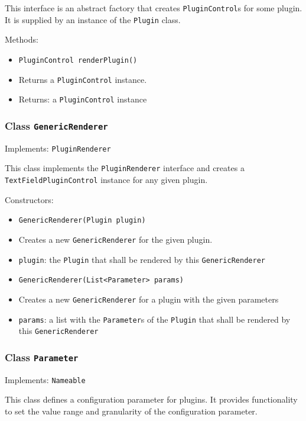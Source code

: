 \documentclass[parskip=full,11pt]{scrartcl}
\begin{document}
This interface is an abstract factory that creates \texttt{PluginControl}s for some plugin. It is supplied by an instance of the \texttt{Plugin} class.

Methods:

\begin{itemize}\itemsep -10pt
	\item \texttt{PluginControl renderPlugin()}
	\item[] Returns a \texttt{PluginControl} instance.
	\item[] Returns: a \texttt{PluginControl} instance
\end{itemize}

\subsubsection{Class \texttt{GenericRenderer}}
Implements: \texttt{PluginRenderer}

This class implements the \texttt{PluginRenderer} interface and creates a \texttt{TextFieldPluginControl} instance for any given plugin.

Constructors:
\begin{itemize}\itemsep -10pt
	\item \texttt{GenericRenderer(Plugin plugin)}
	\item[] Creates a new \texttt{GenericRenderer} for the given plugin.
	\item[] \texttt{plugin}: the \texttt{Plugin} that shall be rendered by this \texttt{GenericRenderer}

	\item \texttt{GenericRenderer(List<Parameter> params)}
	\item[] Creates a new \texttt{GenericRenderer} for a plugin with the given parameters
	\item[] \texttt{params}: a list with the \texttt{Parameter}s of the \texttt{Plugin} that shall be rendered by this \texttt{GenericRenderer}
\end{itemize}

\subsubsection{Class \texttt{Parameter}}
Implements: \texttt{Nameable}

This class defines a configuration parameter for plugins. It provides functionality to set the value range and granularity of the configuration parameter.
\end{document}
